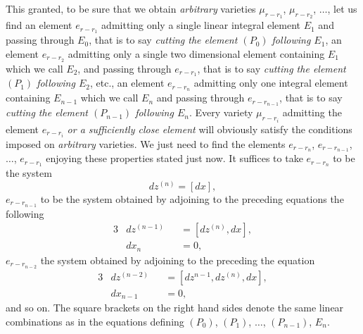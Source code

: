 \documentclass[leqno,11pt]{book}
\theoremstyle{shape1}
\theoremstyle{shapesmall}
\begin{document}
This granted, to be sure that we obtain \emph{arbitrary} varieties $\mu_{r-r_{1}}$, $\mu_{r-r_{2}}$, $\dots$, let us find an element $e_{r-r_{1}}$ admitting only a single linear integral element $E_{1}$ and passing through $E_{0}$, that is to say \emph{cutting the element $(P_{0})$ following $E_{1}$}, an element $e_{r-r_{2}}$ admitting only a single two dimensional element containing $E_{1}$ which we call $E_{2}$, and passing through $e_{r-r_{1}}$, that is to say \emph{cutting the element $(P_{1})$ following $E_{2}$}, etc., an element $e_{r-r_{n}}$ admitting only one integral element containing $E_{n-1}$ which we call $E_{n}$ and passing through $e_{r-r_{n-1}}$, that is to say \emph{cutting the element $(P_{n-1})$ following $E_{n}$}. Every variety $\mu_{r-r_{i}}$ admitting the element $e_{r-r_{i}}$ \emph{or a sufficiently close element} will obviously satisfy the conditions imposed on \emph{arbitrary} varieties. We just need to find the elements $e_{r-r_{n}}$, $e_{r-r_{n-1}}$, $\dots$, $e_{r-r_{1}}$ enjoying these properties stated just now. It suffices to take $e_{r-r_{n}}$ to be the system
\[
dz^{(n)}=[dx],
\] 
$e_{r-r_{n-1}}$ to be the system obtained by adjoining to the preceding equations the following
\begin{alignat*}{3}
  &dz^{(n-1)}&&=[dz^{(n)},dx],\\
  &dx_{n}&&=0,
\end{alignat*}
$e_{r-r_{n-2}}$ the system obtained by adjoining to the preceding the equation
\begin{alignat*}{3}
  &dz^{(n-2)}&&=[dz^{n-1},dz^{(n)},dx],\\
  &dx_{n-1}&&=0,
\end{alignat*}
and so on. The square brackets on the right hand sides denote the same linear combinations as in the equations defining $(P_{0})$, $(P_{1})$, $\dots$, $(P_{n-1})$, $E_{n}$.
\end{document}
